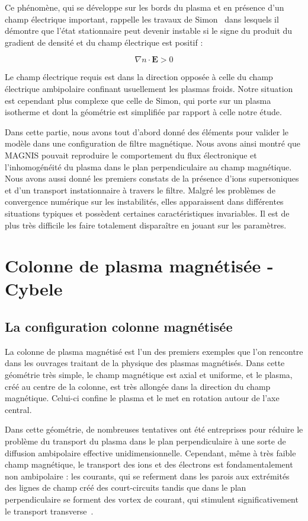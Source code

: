 \begin{refsection}
	 Ce
	phénomène, qui se développe sur les bords du plasma et en présence d'un champ électrique important, rappelle
	les travaux de Simon~\parencite{Simon63} dans lesquels il démontre que l'état
	stationnaire peut devenir instable si le signe du produit du
	gradient de densité et du champ électrique est positif :
	
	\begin{equation}
		\nabla n\cdot \mathbf E>0
	\end{equation}
	
	Le champ électrique requis est dans la direction opposée à celle du champ
	électrique ambipolaire confinant usuellement les plasmas froids. Notre
	situation est cependant plus complexe que celle de Simon, qui porte
	sur un plasma isotherme et dont la géométrie est simplifiée par rapport à
	celle notre étude.

	Dans cette partie, nous avons tout d'abord donné des éléments pour
	valider le modèle dans une configuration de filtre magnétique. Nous avons ainsi
	montré que MAGNIS pouvait reproduire le comportement du flux électronique et
	l'inhomogénéité du plasma dans le plan perpendiculaire au champ
	magnétique. Nous avons aussi donné les premiers constats de la présence d'ions
	supersoniques et d'un transport instationnaire à travers le filtre.
	Malgré les problèmes de convergence numérique sur les instabilités, elles
	apparaissent dans différentes situations typiques et possèdent certaines
	caractéristiques invariables. Il est de plus très difficile les faire
	totalement disparaître en jouant sur les paramètres.
	
\section{Colonne de plasma magnétisée - Cybele}
\subsection{La configuration colonne magnétisée}
La colonne de plasma magnétisé est l'un des premiers
exemples que l'on rencontre dans les ouvrages traitant de la physique des
plasmas magnétisés. Dans cette géométrie très simple, le champ
magnétique est axial et uniforme, et le plasma, créé au centre de la colonne,
est très allongée dans la direction du champ magnétique. Celui-ci confine le
plasma et le met en rotation autour de l'axe central.

Dans cette géométrie, de nombreuses tentatives ont été entreprises pour
réduire le problème du transport du plasma dans le plan perpendiculaire à une
sorte de diffusion ambipolaire effective unidimensionnelle.
Cependant, même à très faible champ magnétique, le transport des ions et des
électrons est fondamentalement non ambipolaire : les courants, qui se referment
dans les parois aux extrémités des lignes de champ créé des court-circuits
tandis que dans le plan perpendiculaire se forment des vortex de courant, qui
stimulent significativement le transport transverse~\parencite{Gurevich}.


\end{refsection}
